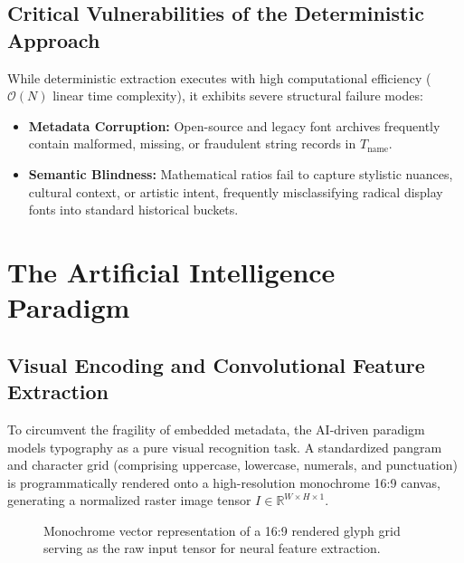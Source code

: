 \documentclass[11pt, onecolumn, a4paper]{article}
\begin{document}
\subsection{Critical Vulnerabilities of the Deterministic Approach}
While deterministic extraction executes with high computational efficiency ($\mathcal{O}(N)$ linear time complexity), it exhibits severe structural failure modes:
\begin{itemize}
    \item \textbf{Metadata Corruption:} Open-source and legacy font archives frequently contain malformed, missing, or fraudulent string records in $T_{\text{name}}$.
    \item \textbf{Semantic Blindness:} Mathematical ratios fail to capture stylistic nuances, cultural context, or artistic intent, frequently misclassifying radical display fonts into standard historical buckets.
\end{itemize}

\section{The Artificial Intelligence Paradigm}

\subsection{Visual Encoding and Convolutional Feature Extraction}
To circumvent the fragility of embedded metadata, the AI-driven paradigm models typography as a pure visual recognition task. A standardized pangram and character grid (comprising uppercase, lowercase, numerals, and punctuation) is programmatically rendered onto a high-resolution monochrome 16:9 canvas, generating a normalized raster image tensor $I \in \mathbb{R}^{W \times H \times 1}$.

\begin{figure}[htbp]
    \centering
    \caption{Monochrome vector representation of a 16:9 rendered glyph grid serving as the raw input tensor for neural feature extraction.}
    \label{fig:tensor_input}
\end{figure}
\end{document}
